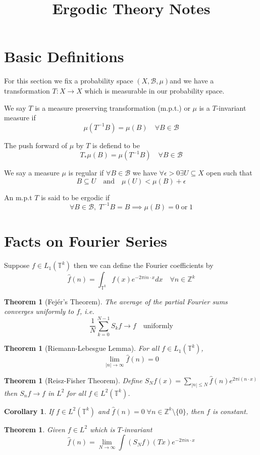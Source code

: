 \documentclass[11pt]{article}
\title{Ergodic Theory Notes}
\author{}
\date{}
\newcommand{\abs}[1]{|#1|}
\newcommand{\msrspc}{\ensuremath{(X,\mathcal{B},\mu)}}
\newcommand{\ktor}{\mathbb{T}^k}
\newcommand{\Z}{\mathbb{Z}}
\newenvironment{defin}
	{\begin{mdframed}[backgroundcolor=white, roundcorner=5pt, linewidth=1pt]}
	{\end{mdframed}}
\newcommand{\mdf}[1]{{\color{red} #1}}
\newtheorem{theorem}[prop]{Theorem}
\newtheorem{cor}[prop]{Corollary}
\begin{document}
\maketitle

\section{Basic Definitions}

For this section we fix a probability space \msrspc and we have a transformation $T:X\to X$ which is measurable in our probability space.

\begin{defin}
	
We say $T$ is a \mdf{measure preserving transformation (m.p.t.)} or $\mu$ is a \mdf{$T$-invariant measure} if 
$$\mu(T^{-1}B)=\mu(B)\quad\forall B\in\mathcal{B}$$

The \mdf{push forward of $\mu$ by $T$} is defiend to be
	$$T_*\mu(B)=\mu(T^{-1}B)\quad\forall B \in\mathcal{B}$$

We say a measure $\mu$ is \mdf{regular} if $\forall B\in\mathcal{B}$ we have $\forall\epsilon >0 \exists U\subseteq X$ open such that
$$B\subseteq U \quad \text{and} \quad \mu(U) < \mu(B) + \epsilon$$

An m.p.t $T$ is said to be \mdf{ergodic} if
$$\forall B\in\mathcal{B},\; T^{-1}B=B \implies \mu(B)=0\;\text{or}\;1$$

\end{defin}

\section{Facts on Fourier Series}
Suppose $f\in L_1(\ktor)$ then we can define the \mdf{Fourier coefficients} by
$$\hat{f}(n)=\int_{\ktor}f(x)e^{-2\pi in\cdot x}dx\quad\forall n\in\Z^k$$
\begin{theorem}[Fej\'er's Theorem]
The average of the partial Fourier sums converges uniformly to $f$, i.e.
$$\frac{1}{N}\sum_{k=0}^{N-1}S_kf\to f\quad\text{uniformly}$$
\end{theorem}
\begin{theorem}[Riemann-Lebesgue Lemma]
	For all $f\in L_1(\ktor)$, $$\lim_{\abs{n}\to\infty}\hat{f}(n)=0$$
\end{theorem}
\begin{theorem}[Reisz-Fisher Theorem]
Define $S_Nf(x)=\sum_{\abs{n}\leq N}\hat{f}(n)e^{2\pi i (n\cdot x)}$
then $S_nf\to f$ in $L^2$ for all $f\in L^2(\ktor)$.
\end{theorem}
\begin{cor}
If $f\in L^2(\ktor)$ and $\hat{f}(n)=0\;\forall n\in\Z^k\setminus\{0\}$, then $f$ is constant.
\end{cor}
\begin{theorem}
Given $f\in L^2$ which is $T$-invariant
$$\hat{f}(n)=\lim_{N\to\infty}\int (S_N f)(Tx)e^{-2\pi i n\cdot x}$$
\end{theorem}
\end{document}
